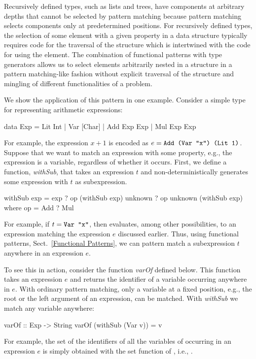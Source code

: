 \noindent
Recursively defined
types, such as lists and trees, have components at arbitrary
depths that cannot be selected by pattern matching because pattern
matching selects components only at predetermined positions.  
For recursively defined types, the
selection of some element with a given property in a
data structure typically requires code for the traversal of the
structure which is intertwined with the code for using the element.  The
combination of functional patterns with type generators
allows us to select elements arbitrarily nested in a
structure in a pattern matching-like fashion without
explicit traversal of the structure and mingling of
different functionalities of a problem.

We show the application of this pattern in one example.
Consider a simple type for representing arithmetic
expressions:
%
\begin{prog}
data Exp = Lit Int
         | Var [Char]
         | Add Exp Exp
         | Mul Exp Exp
\end{prog}
%
For example, the expression $x+1$ is encoded as 
$e = \code{Add (Var "x") (Lit 1)}$.
Suppose that we want to match an expression with 
some property, e.g., the expression is a variable,
regardless of whether it occurs.
First, we define a function, \emph{withSub},
that takes an expression $t$
and non-deterministically generates 
some expression with $t$ as subexpression.
%
\begin{prog}
withSub exp = exp
            ? op (withSub exp) unknown
            ? op unknown (withSub exp)
   where op = Add ? Mul  
\end{prog}
%
For example, if $t = \code{Var "x"}$, then
 evaluates, among other possibilities,
to an expression matching the expression $e$ discussed earlier.
Thus, using functional patterns, Sect.~\ref{Functional Patterns},
we can pattern match a subexpression $t$ anywhere in an expression $e$.

To see this in action, consider the function \emph{varOf} defined below.
This function takes an expression $e$ and returns  the identifier
of a variable occurring anywhere in $e$.  With ordinary pattern matching,
only a variable at a fixed position, e.g., the root or the left
argument of an expression, can be matched.  With \emph{withSub} we
match any variable anywhere:
%
\begin{prog}
varOf :: Exp -> String
varOf (withSub (Var v)) = v  
\end{prog}
%
For example, the set of the identifiers of all the variables of
occurring in an expression $e$ is simply obtained with the set function
of , i.e., 
.

